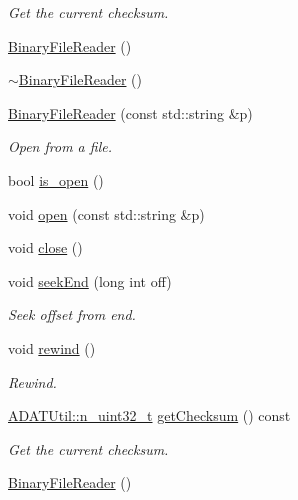 \begin{DoxyCompactItemize}
\begin{DoxyCompactList}\small\item\em Get the current checksum. \end{DoxyCompactList}\item 
\mbox{\hyperlink{classADATIO_1_1BinaryFileReader_a77475e594db53a85f7f15050a442faa1}{Binary\+File\+Reader}} ()
\item 
\mbox{\hyperlink{classADATIO_1_1BinaryFileReader_aa0905fcdd1723ce850a89baf9a111345}{$\sim$\+Binary\+File\+Reader}} ()
\item 
\mbox{\hyperlink{classADATIO_1_1BinaryFileReader_a987273f138d0fcc4a1e9a95c51b093ef}{Binary\+File\+Reader}} (const std\+::string \&p)
\begin{DoxyCompactList}\small\item\em Open from a file. \end{DoxyCompactList}\item 
bool \mbox{\hyperlink{classADATIO_1_1BinaryFileReader_a679fa9d101de2993355f4dd193d4f64d}{is\+\_\+open}} ()
\item 
void \mbox{\hyperlink{classADATIO_1_1BinaryFileReader_a5a7c5bb025902fd04642fb154542dc6a}{open}} (const std\+::string \&p)
\item 
void \mbox{\hyperlink{classADATIO_1_1BinaryFileReader_af0501cb948e5220209226970867dbb26}{close}} ()
\item 
void \mbox{\hyperlink{classADATIO_1_1BinaryFileReader_a1ae70d2eb56f1c1b1769ce9557f8ebbf}{seek\+End}} (long int off)
\begin{DoxyCompactList}\small\item\em Seek offset from end. \end{DoxyCompactList}\item 
void \mbox{\hyperlink{classADATIO_1_1BinaryFileReader_a4f15e41f00be97ad3a0e8bb97c90b704}{rewind}} ()
\begin{DoxyCompactList}\small\item\em Rewind. \end{DoxyCompactList}\item 
\mbox{\hyperlink{namespaceADATUtil_ad945a8afa4db2d1f89b731964adae97e}{A\+D\+A\+T\+Util\+::n\+\_\+uint32\+\_\+t}} \mbox{\hyperlink{classADATIO_1_1BinaryFileReader_addb0cfdf4c3df174327b1abc136cfc68}{get\+Checksum}} () const
\begin{DoxyCompactList}\small\item\em Get the current checksum. \end{DoxyCompactList}\item 
\mbox{\hyperlink{classADATIO_1_1BinaryFileReader_a77475e594db53a85f7f15050a442faa1}{Binary\+File\+Reader}} ()

\end{DoxyCompactItemize}
